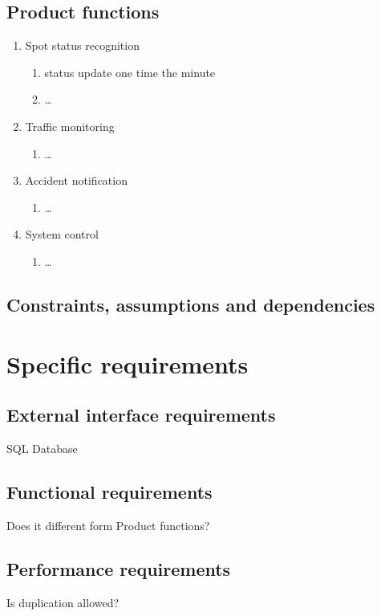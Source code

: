 \documentclass[12pt, a4paper, titlepage]{article}
\begin{document}
		\subsection{Product functions}
			\begin{enumerate}
				\item Spot status recognition
				\begin{enumerate}
					\item status update one time the minute
					\item \ldots
				\end{enumerate}
				\item Traffic monitoring
				\begin{enumerate}
					\item \ldots
				\end{enumerate}	
				\item Accident notification
				\begin{enumerate}
					\item \ldots
				\end{enumerate}	 
				\item System control
				\begin{enumerate}
					\item \ldots
				\end{enumerate}	
			\end{enumerate}
		\subsection{Constraints, assumptions and dependencies}
			
		
	\section{Specific requirements}
		\subsection{External interface requirements}
			SQL Database
			
		\subsection{Functional requirements}
			Does it different form Product functions?
			
		\subsection{Performance requirements}
			Is duplication allowed?
			
\end{document}
